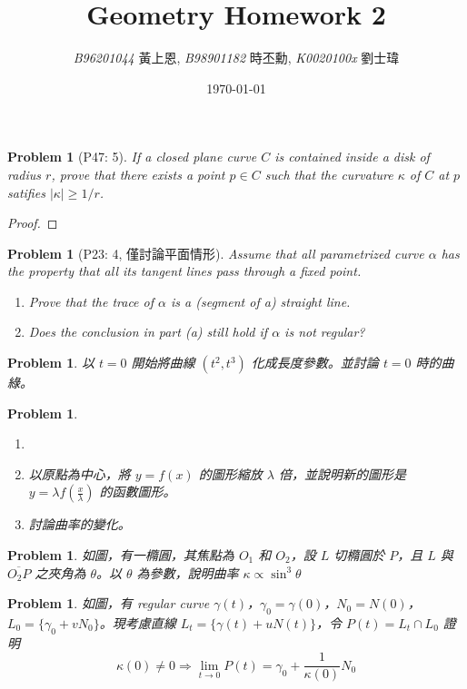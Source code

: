 \documentclass[10pt,a4paper]{article}
\newcounter{theProblemCounter}
\newtheorem{problem}[theProblemCounter]{Problem}
\begin{document}
\title{{Geometry Homework 2}}
\author{{\it{B96201044}} 黃上恩, {\it{B98901182}} 時丕勳, {\it{K0020100x}} 劉士瑋}
\date{\today}
\maketitle

\setcounter{theProblemCounter}{2}
\begin{problem}[P47: 5]
If a closed plane curve $C$ is contained inside a disk of radius $r$, prove that there exists a point $p\in C$ such that the curvature $\kappa$ of $C$ at $p$ satifies $|\kappa|\ge 1/r$.
\end{problem}
\begin{proof}
\end{proof}

\setcounter{theProblemCounter}{3}
\begin{problem}[P23: 4, 僅討論平面情形]
Assume that all parametrized curve $\alpha$ has the property that all its tangent lines pass through a fixed point.
\begin{enumerate}
\item[(a)] Prove that the trace of $\alpha$ is a (segment of a) straight line.
\item[(b)] Does the conclusion in part (a) still hold if $\alpha$ is not regular?
\end{enumerate}
\end{problem}

\setcounter{theProblemCounter}{4}
\begin{problem}
以 $t=0$ 開始將曲線 $(t^2, t^3)$ 化成長度參數。並討論 $t=0$ 時的曲綠。
\end{problem}

\setcounter{theProblemCounter}{5}
\begin{problem}
\begin{enumerate}
\item[]
\item[(a)] 以原點為中心，將 $y=f(x)$ 的圖形縮放 $\lambda$ 倍，並說明新的圖形是 $y=\lambda f(\frac{x}{\lambda})$ 的函數圖形。
\item[(b)] 討論曲率的變化。
\end{enumerate}
\end{problem}

\setcounter{theProblemCounter}{6}
\begin{problem}
如圖，有一橢圓，其焦點為 $O_1$ 和 $O_2$，設 $L$ 切橢圓於 $P$，且 $L$ 與 $\overline{O_2P}$ 之夾角為 $\theta$。以 $\theta$ 為參數，說明曲率 $\kappa\propto\sin^3\theta$
\end{problem}

\setcounter{theProblemCounter}{8}
\begin{problem}
如圖，有 regular curve $\gamma(t)$，$\gamma_0=\gamma(0)$，$N_0=N(0)$，$L_0=\{\gamma_0+vN_0\}$。現考慮直線 $L_t=\{\gamma(t)+uN(t)\}$，令 $P(t)=L_t\cap L_0$ 證明
\[\kappa(0)\ne 0\Rightarrow \lim_{t\to 0}P(t)=\gamma_0 + \frac{1}{\kappa(0)}N_0\]
\end{problem}
\end{document}
